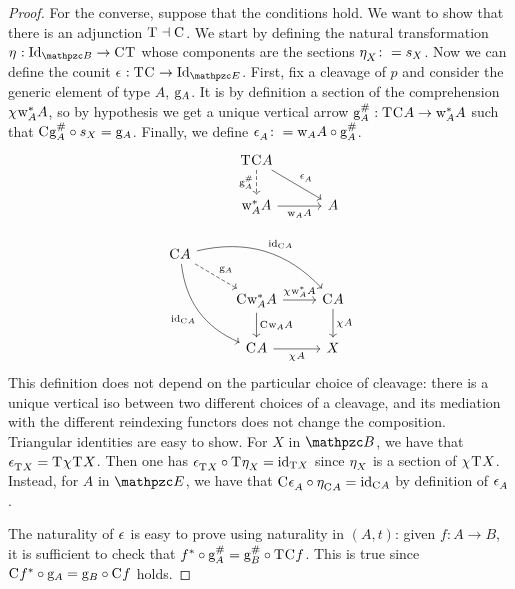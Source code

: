 \documentclass{lmcs} %
\theoremstyle{plain}\newtheorem{satz}[thm]{Satz} %
\begin{document}
\begin{proof}
				For the converse, suppose that the conditions hold. We want to show that there is an adjunction $\mathrm{T}^{}\dashv\mathrm{C}^{}$. We start by defining the natural transformation $\un{}:\Id{\ct{B}}\to \comp{}\term{}$ whose components are the sections $\mathrm{\eta}^{}_X\colon= s_X$.	Now we can define the counit $\coun{}:\term{}\comp{}\to\Id{\ct{E}}$. First, fix a cleavage of $p$ and consider the generic element of type $A$, $\mathrm{g}_{A}$. It is by definition a section of the comprehension $\chi^{}\mathrm{w}_{A}^*A$, so by hypothesis we get a unique vertical arrow $\mathrm{g}_{A}^{\#}:\mathrm{T}^{}\mathrm{C}^{}A\to\mathrm{w}_{A}^*A$ such that $\mathrm{C}^{}\mathrm{g}_{A}^{\#}\circ s_X= \mathrm{g}_{A}$. Finally, we define $\mathrm{\epsilon}^{}_A\colon = \mathrm{w}_{A}A\circ \mathrm{g}_{A}^{\#}$. 
				\[\begin{tikzcd}
					& {\term{}\comp{}A} \\
					& {\weak{A}{A}} & A \\
					{\comp{}A} \\
					& {\comp{}\weak{A}{A}} & {\comp{}A} \\
					& {\comp{}A} & X
					\arrow["{\gel{A}^{\#}}"', dashed, from=1-2, to=2-2]
					\arrow["{\coun{}_A}", from=1-2, to=2-3]
					\arrow["{\weakar{A}{A}}"', from=2-2, to=2-3]
					\arrow["{{\gel{A}}}", dashed, from=3-1, to=4-2]
					\arrow["{{\id{\comp{}A}}}", bend left, from=3-1, to=4-3]
					\arrow["{{\id{\comp{}A}}}"', bend right, from=3-1, to=5-2]
					\arrow["{\jcomp{}\weak{A}{A}}", from=4-2, to=4-3]
					\arrow["{{\comp{}\weakar{A}{A}}}", from=4-2, to=5-2]
					\arrow["{{\jcomp{}A}}", from=4-3, to=5-3]
					\arrow["{{\jcomp{}A}}"', from=5-2, to=5-3]
				\end{tikzcd}\]
				This definition does not depend on the particular choice of cleavage: there is a unique vertical iso between two different choices of a cleavage, and its mediation with the different reindexing functors does not change the composition. Triangular identities are easy to show. For $X$ in $\ct{B}$, we have that $\mathrm{\epsilon}^{}_{\mathrm{T}^{}X}=\mathrm{T}^{}\chi^{}\mathrm{T}^{}X$. Then one has $\mathrm{\epsilon}^{}_{\mathrm{T}^{}X}\circ\mathrm{T}^{}\mathrm{\eta}^{}_X=\mathrm{id}_{\mathrm{T}^{}X}$ since $\mathrm{\eta}^{}_X$ is a section of $\chi^{}\mathrm{T}^{}X$.	Instead, for $A$ in $\ct{E}$, we have that $\mathrm{C}^{}\mathrm{\epsilon}^{}_A\circ\mathrm{\eta}^{}_{\mathrm{C}^{}A}=\mathrm{id}_{\mathrm{C}^{}A}$ by definition of $\mathrm{\epsilon}^{}_A$.
				
				The naturality of $\mathrm{\epsilon}^{}$ is easy to prove using naturality in $(A,t)$: given $f:A\to B$, it is sufficient to check that $f^*\circ\mathrm{g}_{A}^{\#}=\mathrm{g}_{B}^{\#}\circ\mathrm{T}^{}\mathrm{C}^{}f$. This is true since $\mathrm{C}^{}f^*\circ\mathrm{g}_{A}=\mathrm{g}_{B}\circ\mathrm{C}^{}f$ holds.
				
			\end{proof}
			
\end{document}
